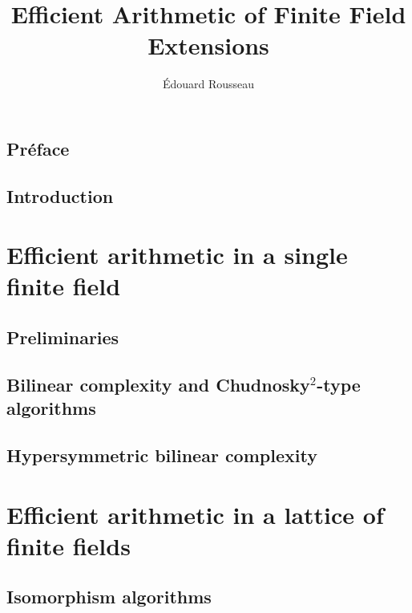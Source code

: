 \documentclass[a4paper,11pt]{report}
\title{Efficient Arithmetic of Finite Field Extensions}
\author{Édouard Rousseau}
\begin{document}
\maketitle



\dominitoc
\tableofcontents
\adjustmtc


\chapter*{Préface}


\chapter{Introduction}


\part{Efficient arithmetic in a single finite field}
\label{part:single}

\chapter{Preliminaries}
\label{chap:preliminary}


\chapter{Bilinear complexity and Chudnosky$^2$-type algorithms}
\label{chap:bilinear}


\chapter{Hypersymmetric bilinear complexity}
\label{chap:hypersymmetric}


\part{Efficient arithmetic in a lattice of finite fields}
\label{part:lattice}

\chapter{Isomorphism algorithms}
\label{chap:isomorphism}

\end{document}
